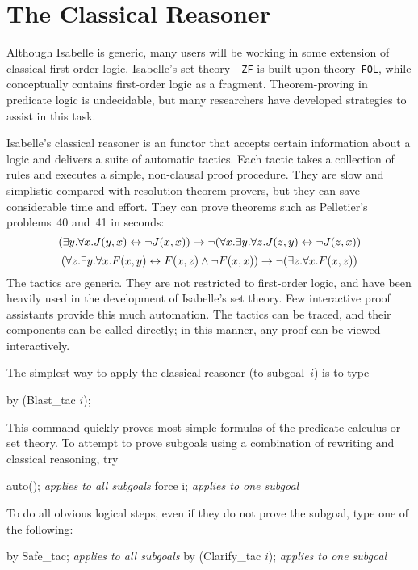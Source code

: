 \chapter{The Classical Reasoner}\label{chap:classical}
\newcommand\ainfer[2]{\begin{array}{r@{\,}l}#2\\ \hline#1\end{array}}

Although Isabelle is generic, many users will be working in some
extension of classical first-order logic.  Isabelle's set theory~{\tt
  ZF} is built upon theory~\texttt{FOL}, while {\HOL}
conceptually contains first-order logic as a fragment.
Theorem-proving in predicate logic is undecidable, but many
researchers have developed strategies to assist in this task.

Isabelle's classical reasoner is an \ML{} functor that accepts certain
information about a logic and delivers a suite of automatic tactics.  Each
tactic takes a collection of rules and executes a simple, non-clausal proof
procedure.  They are slow and simplistic compared with resolution theorem
provers, but they can save considerable time and effort.  They can prove
theorems such as Pelletier's~\cite{pelletier86} problems~40 and~41 in
seconds:
\[ (\exists y. \forall x. J(y,x) \leftrightarrow \neg J(x,x))  
   \rightarrow  \neg (\forall x. \exists y. \forall z. J(z,y) \leftrightarrow \neg J(z,x)) \]
\[ (\forall z. \exists y. \forall x. F(x,y) \leftrightarrow F(x,z) \wedge \neg F(x,x))
   \rightarrow \neg (\exists z. \forall x. F(x,z))  
\]
%
The tactics are generic.  They are not restricted to first-order logic, and
have been heavily used in the development of Isabelle's set theory.  Few
interactive proof assistants provide this much automation.  The tactics can
be traced, and their components can be called directly; in this manner,
any proof can be viewed interactively.

The simplest way to apply the classical reasoner (to subgoal~$i$) is to type
\begin{ttbox}
by (Blast_tac \(i\));
\end{ttbox}
This command quickly proves most simple formulas of the predicate calculus or
set theory.  To attempt to prove subgoals using a combination of
rewriting and classical reasoning, try
\begin{ttbox}
auto();                         \emph{\textrm{applies to all subgoals}}
force i;                        \emph{\textrm{applies to one subgoal}}
\end{ttbox}
To do all obvious logical steps, even if they do not prove the
subgoal, type one of the following:
\begin{ttbox}
by Safe_tac;                   \emph{\textrm{applies to all subgoals}}
by (Clarify_tac \(i\));            \emph{\textrm{applies to one subgoal}}
\end{ttbox}



